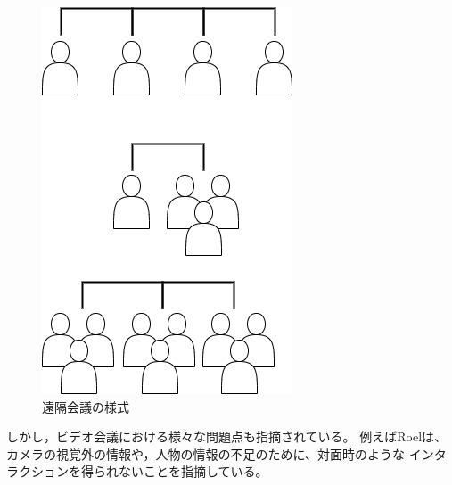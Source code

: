 \begin{figure}[tbp]
  \centering
  \includegraphics[scale=0.7]{fig/conference.png}
  \caption{遠隔会議の様式}
\end{figure}

しかし，ビデオ会議における様々な問題点も指摘されている。
例えばRoel\cite{3}は、カメラの視覚外の情報や，人物の情報の不足のために、対面時のような
インタラクションを得られないことを指摘している。


